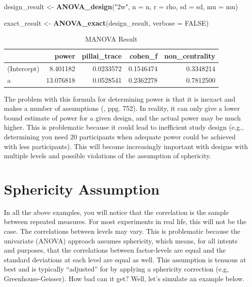 \documentclass[]{book}
\newenvironment{Shaded}{\begin{snugshade}}{\end{snugshade}}
\newcommand{\DataTypeTok}[1]{\textcolor[rgb]{0.13,0.29,0.53}{#1}}
\newcommand{\KeywordTok}[1]{\textcolor[rgb]{0.13,0.29,0.53}{\textbf{#1}}}
\newcommand{\NormalTok}[1]{#1}
\newcommand{\OtherTok}[1]{\textcolor[rgb]{0.56,0.35,0.01}{#1}}
\newcommand{\StringTok}[1]{\textcolor[rgb]{0.31,0.60,0.02}{#1}}
\begin{document}
\begin{Shaded}
\begin{Highlighting}[]
\NormalTok{design_result <-}\StringTok{ }\KeywordTok{ANOVA_design}\NormalTok{(}\StringTok{"2w"}\NormalTok{,}
                              \DataTypeTok{n =}\NormalTok{ n,}
                              \DataTypeTok{r =}\NormalTok{ rho,}
                              \DataTypeTok{sd =}\NormalTok{ sd,}
                              \DataTypeTok{mu =}\NormalTok{ mu)}

\NormalTok{exact_result <-}\StringTok{ }\KeywordTok{ANOVA_exact}\NormalTok{(design_result, }\DataTypeTok{verbose =} \OtherTok{FALSE}\NormalTok{)}
\end{Highlighting}
\end{Shaded}

\begin{table}[!h]

\caption{\label{tab:unnamed-chunk-174}MANOVA Result}
\centering
\begin{tabular}{l|r|r|r|r}
\hline
  & power & pillai\_trace & cohen\_f & non\_centrality\\
\hline
(Intercept) & 8.401182 & 0.0233572 & 0.1546474 & 0.3348214\\
\hline
a & 13.076818 & 0.0528541 & 0.2362278 & 0.7812500\\
\hline
\end{tabular}
\end{table}

The problem with this formula for determining power is that it is inexact and makes a number of assumptions (\citet{maxwell_designing_2004}, ppg. 752). In reality, it can only give a lower bound estimate of power for a given design, and the actual power may be much higher. This is problematic because it could lead to inefficient study design (e.g., determining you need 20 participants when adequate power could be achieved with less participants). This will become increasingly important with designs with multiple levels and possible violations of the assumption of sphericity.

\hypertarget{sphericity-assumption}{%
\section{Sphericity Assumption}\label{sphericity-assumption}}

In all the above examples, you will notice that the correlation is the sample between repeated measures. For most experiments in real life, this will not be the case. The correlations between levels may vary. This is problematic because the univariate (ANOVA) approach assumes sphericity, which means, for all intents and purposes, that the correlations between factor-levels are equal and the standard deviations at each level are equal as well. This assumption is tenuous at best and is typically ``adjusted'' for by applying a sphericity correction (e.g, Greenhouse-Geisser). How bad can it get? Well, let's simulate an example below.
\end{document}
